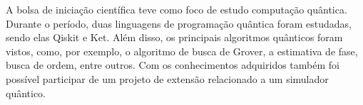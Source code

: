 
\begin{resumo}
    A bolsa de iniciação científica teve como foco de estudo computação quântica.
    Durante o período, duas linguagens de programação quântica foram estudadas, sendo elas Qiskit e Ket.
    Além disso, os principais algoritmos quânticos foram vistos, como, por exemplo, o algoritmo de busca de Grover, a estimativa de fase, busca de ordem, entre outros.
    Com os conhecimentos adquiridos também foi possível participar de um projeto de extensão relacionado a um simulador quântico.
\end{resumo}
\newpage

